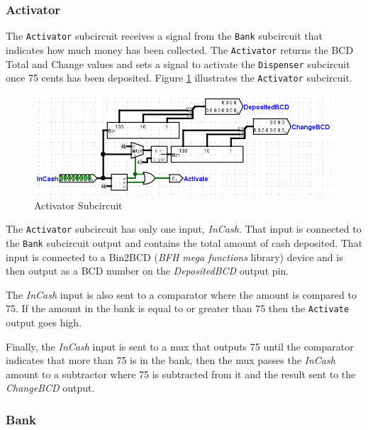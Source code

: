 \subsubsection{Activator}

The \lstinline[columns=fixed]|Activator| subcircuit receives a signal from the \lstinline[columns=fixed]|Bank| subcircuit that indicates how much money has been collected. The \lstinline[columns=fixed]|Activator| returns the \ac{BCD} Total and Change values and sets a signal to activate the \lstinline[columns=fixed]|Dispenser| subcircuit once 75 cents has been deposited. Figure \ref{fig:vend-02} illustrates the \lstinline[columns=fixed]|Activator| subcircuit.

\begin{figure}[H]
	\centering
	\includegraphics[width=\maxwidth{.95\linewidth}]{gfx/vend-02}
	\caption{Activator Subcircuit}
	\label{fig:vend-02}
\end{figure}

The \lstinline[columns=fixed]|Activator| subcircuit has only one input, \textit{InCash}. That input is connected to the \lstinline[columns=fixed]|Bank| subcircuit output and contains the total amount of cash deposited. That input is connected to a Bin2BCD (\textit{BFH mega functions} library) device and is then output as a \ac{BCD} number on the \textit{DepositedBCD} output pin.

The \textit{InCash} input is also sent to a comparator where the amount is compared to 75. If the amount in the bank is equal to or greater than 75 then the \lstinline[columns=fixed]|Activate| output goes high.

Finally, the \textit{InCash} input is sent to a mux that outputs 75 until the comparator indicates that more than 75 is in the bank, then the mux passes the \textit{InCash} amount to a subtractor where 75 is subtracted from it and the result sent to the \textit{ChangeBCD} output.

\subsubsection{Bank}

